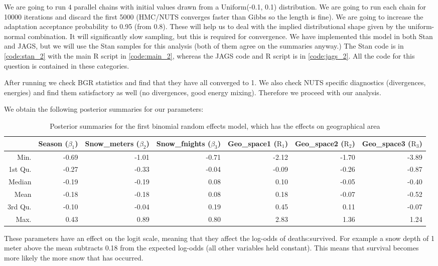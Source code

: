 \documentclass[10pt]{extarticle}
\begin{document}
We are going to run $4$ parallel chains with initial values drawn from a Uniform(-0.1, 0.1) distribution. We are going to run each chain for 10000 iterations and discard the first 5000 (HMC/NUTS converges faster than Gibbs so the length is fine). We are going to increase the adaptation acceptance probability to 0.95 (from 0.8). These will help us to deal with the implied distributional shape given by the uniform-normal combination. It will significantly slow sampling, but this is required for convergence. We have implemented this model in both Stan and JAGS, but we will use the Stan samples for this analysis (both of them agree on the summaries anyway.) The Stan code is in \ref{code:stan_2} with the main R script in \ref{code:main_2}, whereas the JAGS code and R script is in \ref{code:jags_2}. All the code for this question is contained in these categories.

After running we check BGR statistics and find that they have all converged to 1. We also check NUTS specific diagnostics (divergences, energies) and find them satisfactory as well (no divergences, good energy mixing). Therefore we proceed with our analysis.

We obtain the following posterior summaries for our parameters:

\begin{table}[ht]
	\centering
	\tiny
	\begin{tabular}{r|rrrrrr}
		\hline
		& Season ($\beta_1$) & Snow\_meters ($\beta_2$) & Snow\_fnights ($\beta_3$) & Geo\_space1 ($\mathrm{R}_{1}$) & Geo\_space2 ($\mathrm{R}_{2}$) & Geo\_space3 ($\mathrm{R}_{3}$)\\ 
		\hline
		Min. & -0.69 & -1.01 & -0.71 & -2.12 & -1.70 & -3.89 \\ 
		1st Qu. & -0.27 & -0.33 & -0.04 & -0.09 & -0.26 & -0.87 \\ 
		Median & -0.19 & -0.19 & 0.08 & 0.10 & -0.05 & -0.40 \\ 
		Mean & -0.18 & -0.18 & 0.08 & 0.18 & -0.07 & -0.52 \\ 
		3rd Qu. & -0.10 & -0.04 & 0.19 & 0.45 & 0.11 & -0.07 \\ 
		Max. & 0.43 & 0.89 & 0.80 & 2.83 & 1.36 & 1.24 \\ 
		\hline
	\end{tabular}
\caption{Posterior summaries for the first binomial random effects model, which has the effects on geographical area}
\label{tab:postsum_binmod1}
\end{table}

These parameters have an effect on the logit scale, meaning that they affect the log-odds of deaths:survived. For example a snow depth of 1 meter above the mean subtracts 0.18 from the expected log-odds (all other variables held constant). This means that survival becomes more likely the more snow that has occurred. 
\end{document}
